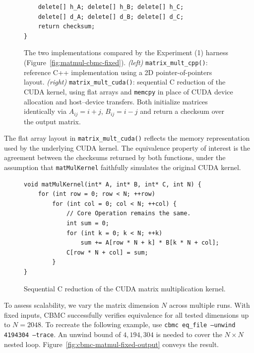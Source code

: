 \documentclass{article}
\begin{document}
\begin{figure}[h]
\begin{minipage}[t]{0.48\linewidth}
\begin{verbatim}
    delete[] h_A; delete[] h_B; delete[] h_C;
    delete[] d_A; delete[] d_B; delete[] d_C;
    return checksum;
}
\end{verbatim}
\end{minipage}
\caption{The two implementations compared by the Experiment (1) harness (Figure~\ref{fig:matmul-cbmc-fixed}). \textit{(left)} \texttt{matrix\_mult\_cpp()}: reference C++ implementation using a 2D pointer-of-pointers layout. \textit{(right)} \texttt{matrix\_mult\_cuda()}: sequential C reduction of the CUDA kernel, using flat arrays and \texttt{memcpy} in place of CUDA device allocation and host--device transfers. Both initialize matrices identically via $A_{ij} = i+j$, $B_{ij} = i-j$ and return a checksum over the output matrix.}
\label{fig:matmul-cpp-cuda-pair}
\end{figure}

The flat array layout in \texttt{matrix\_mult\_cuda()} reflects the memory representation used by the underlying CUDA kernel. The equivalence property of interest is the agreement between the checksums returned by both functions, under the assumption that \texttt{matMulKernel} faithfully simulates the original CUDA kernel.

\begin{figure}[H]
\begin{verbatim}
void matMulKernel(int* A, int* B, int* C, int N) {
    for (int row = 0; row < N; ++row)
        for (int col = 0; col < N; ++col) {
            // Core Operation remains the same.
            int sum = 0;
            for (int k = 0; k < N; ++k)
                sum += A[row * N + k] * B[k * N + col];
            C[row * N + col] = sum;        
        }
}
\end{verbatim}
\caption{Sequential C reduction of the CUDA matrix multiplication kernel.}
\label{fig:matmul-c-reduction}
\end{figure}

To assess scalability, we vary the matrix dimension $N$ across multiple runs. With fixed inputs, CBMC successfully verifies equivalence for all tested dimensions up to $N = 2048$. To recreate the following example, use \texttt{cbmc eq\_file --unwind 4194304 --trace}. An unwind bound of $4,194,304$ is needed to cover the $N \times N$ nested loop. Figure~\ref{fig:cbmc-matmul-fixed-output} conveys the result.
\end{document}
